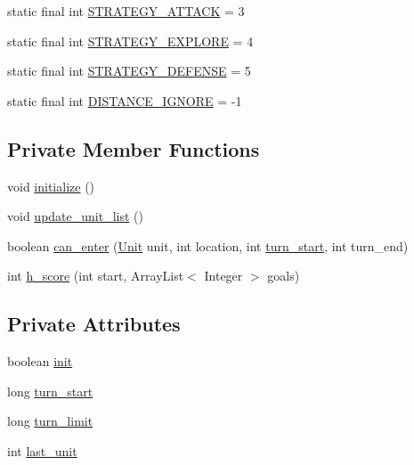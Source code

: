 \begin{DoxyCompactItemize}
\item 
static final int \hyperlink{classai_1_1general_1_1_general_a_i_ae783c4d7aa11aed961f99e1202e49ca1}{STRATEGY\_\-ATTACK} = 3
\item 
static final int \hyperlink{classai_1_1general_1_1_general_a_i_af442f56d5a030005a92174b3d453c57f}{STRATEGY\_\-EXPLORE} = 4
\item 
static final int \hyperlink{classai_1_1general_1_1_general_a_i_aab919e88ee21463d0a217f8bccd0a175}{STRATEGY\_\-DEFENSE} = 5
\item 
static final int \hyperlink{classai_1_1general_1_1_general_a_i_a84cf0b772ef876f73b5379edc5de4120}{DISTANCE\_\-IGNORE} = -\/1
\end{DoxyCompactItemize}
\subsection*{Private Member Functions}
\begin{DoxyCompactItemize}
\item 
void \hyperlink{classai_1_1general_1_1_general_a_i_a73638262ddc2005a3de1b75144f07a10}{initialize} ()
\item 
void \hyperlink{classai_1_1general_1_1_general_a_i_a5241e3b928249ee4e6572ef47030162e}{update\_\-unit\_\-list} ()
\item 
boolean \hyperlink{classai_1_1general_1_1_general_a_i_a883434d0e331f5355e957c4d113d922d}{can\_\-enter} (\hyperlink{classrts_1_1units_1_1_unit}{Unit} unit, int location, int \hyperlink{classai_1_1general_1_1_general_a_i_ad2b487046bcf8f6266ea279f180b3e74}{turn\_\-start}, int turn\_\-end)
\item 
int \hyperlink{classai_1_1general_1_1_general_a_i_a6f2c72afacd8a04a66d22e3e38fed441}{h\_\-score} (int start, ArrayList$<$ Integer $>$ goals)
\end{DoxyCompactItemize}
\subsection*{Private Attributes}
\begin{DoxyCompactItemize}
\item 
boolean \hyperlink{classai_1_1general_1_1_general_a_i_a66079be9509d195d238e176d121a90b5}{init}
\item 
long \hyperlink{classai_1_1general_1_1_general_a_i_ad2b487046bcf8f6266ea279f180b3e74}{turn\_\-start}
\item 
long \hyperlink{classai_1_1general_1_1_general_a_i_ad35fba6e172dba62ee6a025f90a6b6a4}{turn\_\-limit}
\item 
int \hyperlink{classai_1_1general_1_1_general_a_i_a999b2485d3ac59837ac62c40550bfbeb}{last\_\-unit}
\end{DoxyCompactItemize}


